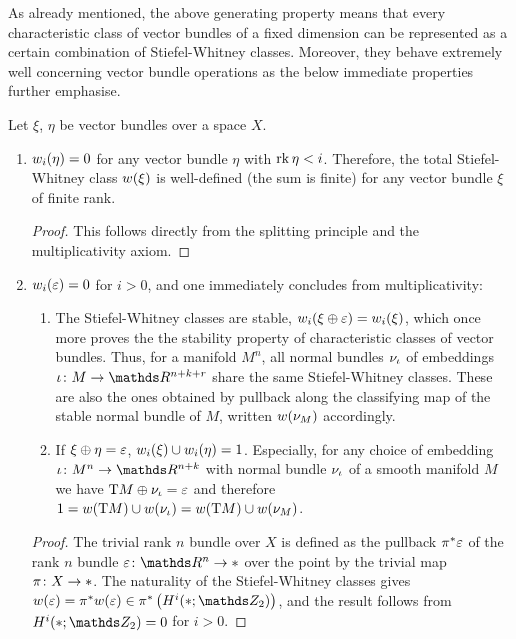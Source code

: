 As already mentioned, the above generating property means that every
characteristic class of vector bundles of a fixed dimension can be
represented as a certain combination of Stiefel-Whitney classes.
Moreover, they behave extremely well concerning vector bundle
operations as the below immediate properties further emphasise.
\begin{Rem}
  \label{rem:propswclasses}
  Let $\xi$, $\eta$ be vector bundles over a space $X$.
  \begin{enumerate} 
  \item\label{item:propswclasses:dimesioncut} ${w_{i}}(\eta) = 0$
    for any vector bundle $\eta$ with $\operatorname{rk}\eta < i$.
    Therefore, the total Stiefel-Whitney class ${w}(\xi)$ is
    well-defined (\idest the sum is finite)
    for any vector bundle $\xi$ of finite rank.
    \begin{proof}
      This follows directly from the splitting principle and
      the multiplicativity axiom.
    \end{proof}
  \item\label{item:swoftrivbdl} ${w_{i}}(\varepsilon)=0$ for $i>0$, and one immediately concludes
    from multiplicativity:
    \begin{enumerate}
    \item\label{item:swclassesstable}
      The Stiefel-Whitney classes are stable, \idest
      ${w_{i}}(\xi\oplus\varepsilon) = {w_{i}}(\xi)$, which once more proves
      the the stability property of characteristic classes of vector bundles.
      Thus, for a manifold $M^n$, all normal bundles $\nu_{{\iota}}$ of
      embeddings $\emb\colon M\to\R^{n+k+r}$ share the same
      Stiefel-Whitney classes. These are also the ones obtained by
      pullback along the classifying map of the stable normal bundle
      of $M$, written ${w}(\nu_{M})$ accordingly.
    \item\label{item:wuclassmfdinverse}
      If $\xi\oplus\eta = \varepsilon$, ${w_{i}}(\xi)\cup{w_{i}}(\eta)=1$.
      Especially, for any choice of embedding $\emb\colon M^n\to\R^{n+k}$
      with normal bundle $\nu_{{\iota}}$ of a smooth manifold $M$ we have
      $\mathrm{T}M\oplus\nu_{{\iota}} = \varepsilon$ and therefore
      $1 = {w}(\mathrm{T}M) \cup {w}(\nu_{{\iota}}) = {w}(\mathrm{T}M)\cup{w}(\nu_{M})$.
    \end{enumerate}
    \begin{proof}
      The trivial rank $n$ bundle over $X$ is defined as the pullback
      ${\pi}^* \varepsilon$ of the rank $n$ bundle
      $\trivbdl\colon \R^n\to\pt$ over the point by the trivial map
      $\pi\colon X\to*$. The naturality of the Stiefel-Whitney
      classes gives $\W{\trivbdl} = \pb\pi \W{\trivbdl}
      \in\pb\pi \left(\H^i(\pt;\Zmod2)\right)$,
      and the result follows from $\H^i(\pt;\Zmod2) = 0$ for $i>0$.
    \end{proof}
  \end{enumerate}
\end{Rem}

